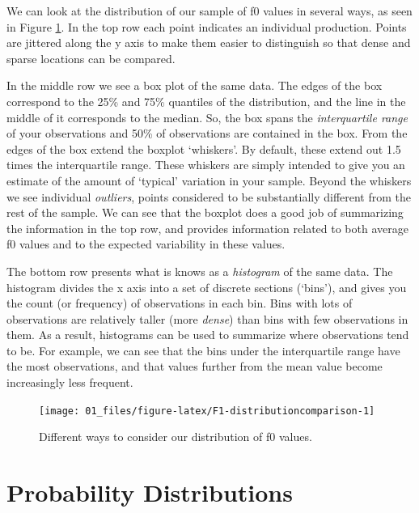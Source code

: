 \documentclass[
]{book}
\begin{document}
We can look at the distribution of our sample of f0 values in several ways, as seen in Figure \ref{fig:F1-distributioncomparison}. In the top row each point indicates an individual production. Points are jittered along the y axis to make them easier to distinguish so that dense and sparse locations can be compared.

In the middle row we see a box plot of the same data. The edges of the box correspond to the 25\% and 75\% quantiles of the distribution, and the line in the middle of it corresponds to the median. So, the box spans the \emph{interquartile range} of your observations and 50\% of observations are contained in the box. From the edges of the box extend the boxplot `whiskers'. By default, these extend out 1.5 times the interquartile range. These whiskers are simply intended to give you an estimate of the amount of `typical' variation in your sample. Beyond the whiskers we see individual \emph{outliers}, points considered to be substantially different from the rest of the sample. We can see that the boxplot does a good job of summarizing the information in the top row, and provides information related to both average f0 values and to the expected variability in these values.

The bottom row presents what is knows as a \emph{histogram} of the same data. The histogram divides the x axis into a set of discrete sections (`bins'), and gives you the count (or frequency) of observations in each bin. Bins with lots of observations are relatively taller (more \emph{dense}) than bins with few observations in them. As a result, histograms can be used to summarize where observations tend to be. For example, we can see that the bins under the interquartile range have the most observations, and that values further from the mean value become increasingly less frequent.

\begin{figure}

{\centering \texttt{[image: 01\_files/figure-latex/F1-distributioncomparison-1]} 

}

\caption{Different ways to consider our distribution of f0 values.}\label{fig:F1-distributioncomparison}
\end{figure}

\hypertarget{probability-distributions}{%
\section{Probability Distributions}\label{probability-distributions}}
\end{document}
